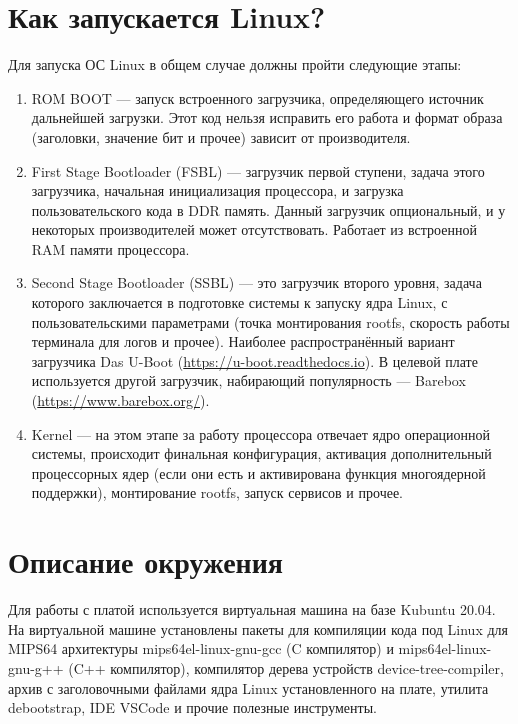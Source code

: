\section*{Как запускается Linux?}
Для запуска ОС Linux в общем случае должны пройти следующие этапы:
\begin{enumerate}
	\item  ROM BOOT — запуск встроенного загрузчика, определяющего источник дальнейшей загрузки. Этот код нельзя исправить его работа и формат образа (заголовки, значение бит и прочее) зависит от производителя.
	
	\item First Stage Bootloader (FSBL) — загрузчик первой ступени, задача этого загрузчика, начальная инициализация процессора, и загрузка пользовательского кода в DDR память. Данный загрузчик опциональный, и у некоторых производителей может отсутствовать. Работает из встроенной RAM памяти процессора.
	
	\item Second Stage Bootloader (SSBL) — это загрузчик второго уровня, задача которого заключается в подготовке системы к запуску ядра Linux, с пользовательскими параметрами (точка монтирования rootfs, скорость работы терминала для логов и прочее). Наиболее распространённый вариант загрузчика Das U-Boot (\href{https://u-boot.readthedocs.io/en/latest/}{https://u-boot.readthedocs.io}). В целевой плате используется другой загрузчик, набирающий популярность — Barebox (\href{https://www.barebox.org/}{https://www.barebox.org/}).
	
	\item Kernel — на этом этапе за работу процессора отвечает ядро операционной системы, происходит финальная конфигурация, активация дополнительный процессорных ядер (если они есть и активирована функция многоядерной поддержки), монтирование rootfs, запуск сервисов и прочее.
\end{enumerate}


\section*{Описание окружения}
Для работы с платой используется виртуальная машина на базе Kubuntu 20.04. На виртуальной машине установлены пакеты для компиляции кода под Linux для MIPS64 архитектуры mips64el-linux-gnu-gcc (C компилятор) и mips64el-linux-gnu-g++ (C++ компилятор), компилятор дерева устройств device-tree-compiler, архив с заголовочными файлами ядра Linux установленного на плате, утилита debootstrap, IDE VSCode и прочие полезные инструменты. 

